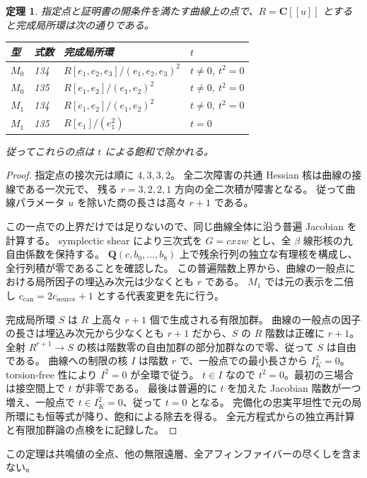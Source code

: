 \documentclass[11pt,a4paper]{ltjsarticle}
\newcommand{\CC}{\mathbf C}
\newcommand{\QQ}{\mathbf Q}
\newtheorem{theorem}{定理}[section]
\theoremstyle{remark}
\begin{document}
\begin{theorem}
指定点と証明書の開条件を満たす曲線上の点で、$R=\CC[[u]]$ とすると完成局所環は次の通りである。
\begin{center}
\begin{tabular}{llll}
\toprule
型&式数&完成局所環&$t$\\\midrule
$M_0$&134&$R[e_1,e_2,e_3]/(e_1,e_2,e_3)^2$&$t\ne0,\ t^2=0$\\
$M_0$&135&$R[e_1,e_2]/(e_1,e_2)^2$&$t\ne0,\ t^2=0$\\
$M_1$&134&$R[e_1,e_2]/(e_1,e_2)^2$&$t\ne0,\ t^2=0$\\
$M_1$&135&$R[e_1]/(e_1^2)$&$t=0$\\\bottomrule
\end{tabular}
\end{center}
従ってこれらの点は $t$ による飽和で除かれる。
\end{theorem}
\begin{proof}
指定点の接次元は順に $4,3,3,2$。
全二次障害の共通 Hessian 核は曲線の接線である一次元で、
残る $r=3,2,2,1$ 方向の全二次積が障害となる。
従って曲線パラメータ $u$ を除いた商の長さは高々 $r+1$ である。

この一点での上界だけでは足りないので、同じ曲線全体に沿う普遍 Jacobian を計算する。
symplectic shear により三次式を $G=cxzw$ とし、全 $\beta$ 線形核の九自由係数を保持する。
$\QQ(c,b_0,\ldots,b_8)$ 上で残余行列の独立な有理核を構成し、全行列積が零であることを確認した。
この普遍階数上界から、曲線の一般点における局所因子の埋込み次元は少なくとも $r$ である。
$M_1$ では元の表示を二倍し $c_{\mathrm{can}}=2c_{\mathrm{source}}+1$ とする代表変更を先に行う。

完成局所環 $S$ は $R$ 上高々 $r+1$ 個で生成される有限加群。
曲線の一般点の因子の長さは埋込み次元から少なくとも $r+1$ だから、$S$ の $R$ 階数は正確に $r+1$。
全射 $R^{r+1}\to S$ の核は階数零の自由加群の部分加群なので零、従って $S$ は自由である。
曲線への制限の核 $I$ は階数 $r$ で、一般点での最小長さから $I_K^2=0$。
torsion-free 性により $I^2=0$ が全環で従う。
$t\in I$ なので $t^2=0$。最初の三場合は接空間上で $t$ が非零である。
最後は普遍的に $t$ を加えた Jacobian 階数が一つ増え、一般点で $t\in I_K^2=0$、従って $t=0$ となる。
完備化の忠実平坦性で元の局所環にも恒等式が降り、飽和による除去を得る。
全元方程式からの独立再計算と有限加群論の点検を\cite{minimal-formal-v34}に記録した。
\end{proof}
この定理は共鳴値の全点、他の無限遠層、全アフィンファイバーの尽くしを含まない。
\end{document}
